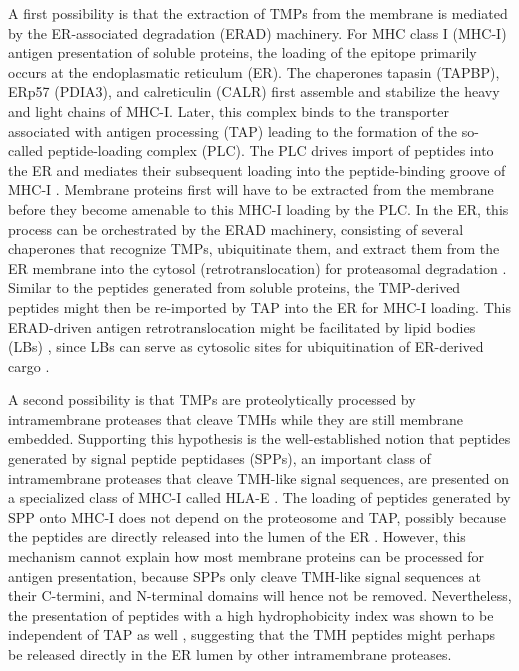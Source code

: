 \documentclass[utf8]{frontiersSCNS} %
\begin{document}
A first possibility is that the extraction of TMPs from the membrane 
is mediated by the ER-associated degradation (ERAD) machinery. 
For MHC class I (MHC-I) antigen presentation of soluble proteins, 
the loading of the epitope primarily occurs at the endoplasmatic reticulum (ER). 
The chaperones tapasin (TAPBP), ERp57 (PDIA3), 
and calreticulin (CALR) \citep{rock2016present} first assemble 
and stabilize the heavy and light chains of MHC-I. 
Later, this complex binds to the transporter 
associated with antigen processing (TAP) 
leading to the formation of the so-called peptide-loading complex (PLC). 
The PLC drives import of peptides into the ER 
and mediates their subsequent loading into the peptide-binding groove of MHC-I \citep{blees2017structure}. 
Membrane proteins first will have to be extracted from the membrane 
before they become amenable to this MHC-I loading by the PLC. 
In the ER, this process can be orchestrated by the ERAD machinery, 
consisting of several chaperones that recognize TMPs, 
ubiquitinate them, and extract them from the ER membrane 
into the cytosol (retrotranslocation) for proteasomal degradation \citep{preston2017evolving,meusser2005erad}. 
Similar to the peptides generated from soluble proteins, 
the TMP-derived peptides might then be re-imported by TAP 
into the ER for MHC-I loading. 
This ERAD-driven antigen retrotranslocation might be facilitated by lipid bodies (LBs) \citep{bougneres2009role}, 
since LBs can serve as cytosolic sites for ubiquitination of ER-derived cargo \citep{fujimoto2006proteasomal}. 

A second possibility is that TMPs are proteolytically processed 
by intramembrane proteases that cleave TMHs while they are still membrane embedded. Supporting this hypothesis is the well-established notion that peptides generated by signal peptide peptidases (SPPs), an important class of intramembrane proteases that cleave TMH-like signal sequences, 
are presented on a specialized class of MHC-I called HLA-E \citep{oliveira2015alternative}. 
The loading of peptides generated by SPP onto MHC-I does not depend on the proteosome and TAP, 
possibly because the peptides are directly released into the lumen of the ER \citep{oliveira2015alternative}. 
However, this mechanism cannot explain how most membrane proteins can be processed for antigen presentation, because SPPs only cleave TMH-like signal sequences at their C-termini, and N-terminal domains will hence not be removed. 
Nevertheless, the presentation of peptides with a high hydrophobicity index 
was shown to be independent of TAP as well \citep{lautscham2001processing}, 
suggesting that the TMH peptides might perhaps be released directly in the ER lumen by other intramembrane proteases. 
\end{document}
